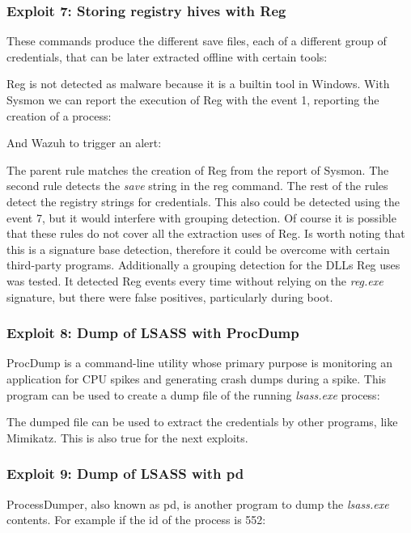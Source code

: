 \subsubsection{Exploit 7: Storing registry hives with Reg}
These commands produce the different save files, each of a different group of credentials, that can be later extracted offline with certain tools\cite{more_dumps}:

\linej
Reg is not detected as malware because it is a builtin tool in Windows. With Sysmon we can report the execution of Reg with the event 1, reporting the creation of a process:

\linej
And Wazuh to trigger an alert:

\linej
The parent rule matches the creation of Reg from the report of Sysmon.
\linej
The second rule detects the \textit{save} string in the reg command.
\linej
The rest of the rules detect the registry strings for credentials.
\linej
\linej
This also could be detected using the event 7, but it would interfere with grouping detection. Of course it is possible that these rules do not cover all the extraction uses of Reg. Is worth noting that this is a signature base detection, therefore it could be overcome with certain third-party programs.
\linej
\linej
Additionally a grouping detection for the DLLs Reg uses was tested. It detected Reg events every time without relying on the \textit{reg.exe} signature, but there were false positives, particularly during boot.

\subsubsection{Exploit 8: Dump of LSASS with ProcDump}
ProcDump\cite{procdump} is a command-line utility whose primary purpose is monitoring an application for CPU spikes and generating crash dumps during a spike. This program can be used to create a dump file of the running \textit{lsass.exe} process:

\linej
The dumped file can be used to extract the credentials by other programs, like Mimikatz\cite{more_dumps}. This is also true for the next exploits.

\subsubsection{Exploit 9: Dump of LSASS with pd}
ProcessDumper, also known as pd\cite{pd}, is another program to dump the \textit{lsass.exe} contents. For example if the id of the process is 552:


